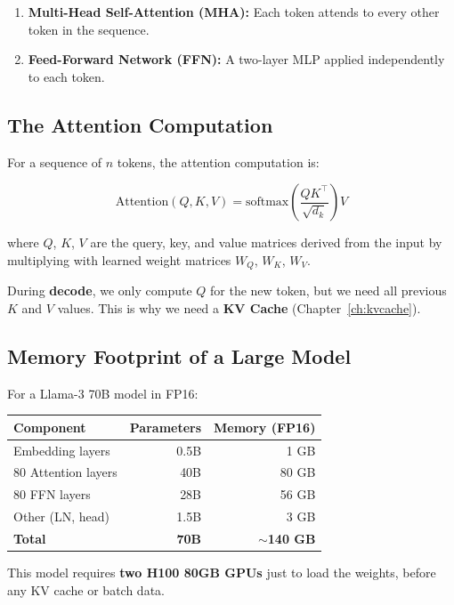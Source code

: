 \documentclass[10pt, oneside, openany]{book}
\begin{document}
\begin{enumerate}
  \item \textbf{Multi-Head Self-Attention (MHA):} Each token attends to every
        other token in the sequence.
  \item \textbf{Feed-Forward Network (FFN):} A two-layer MLP applied independently
        to each token.
\end{enumerate}

\subsection{The Attention Computation}

For a sequence of $n$ tokens, the attention computation is:

\[
  \text{Attention}(Q, K, V) = \text{softmax}\!\left(\frac{QK^\top}{\sqrt{d_k}}\right) V
\]

where $Q$, $K$, $V$ are the query, key, and value matrices derived from the input
by multiplying with learned weight matrices $W_Q$, $W_K$, $W_V$.

During \textbf{decode}, we only compute $Q$ for the new token, but we need all
previous $K$ and $V$ values.  This is why we need a \textbf{KV Cache}
(Chapter~\ref{ch:kvcache}).

\subsection{Memory Footprint of a Large Model}

For a Llama-3 70B model in FP16:

\begin{center}
\begin{tabular}{lrr}
  \toprule
  \textbf{Component} & \textbf{Parameters} & \textbf{Memory (FP16)} \\
  \midrule
  Embedding layers & 0.5B & 1 GB \\
  80 Attention layers & 40B & 80 GB \\
  80 FFN layers & 28B & 56 GB \\
  Other (LN, head) & 1.5B & 3 GB \\
  \midrule
  \textbf{Total} & \textbf{70B} & \textbf{$\sim$140 GB} \\
  \bottomrule
\end{tabular}
\end{center}

This model requires \textbf{two H100 80GB GPUs} just to load the weights, before
any KV cache or batch data.
\end{document}
